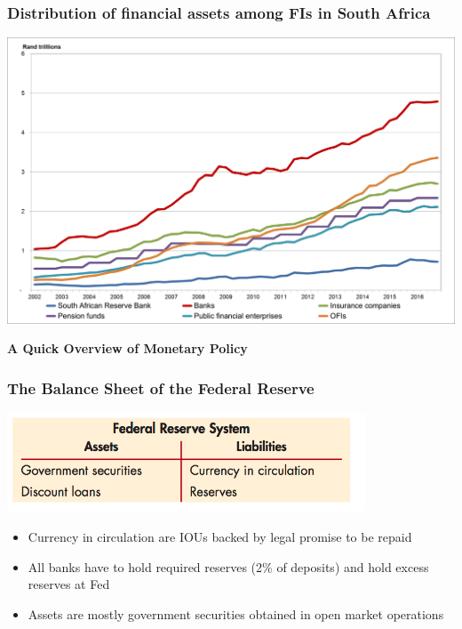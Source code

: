 \documentclass[11pt]{beamer}
\begin{document}
\begin{frame}
\frametitle{Distribution of financial assets among FIs in South Africa}
\includegraphics[width=\textwidth]{Figures/shadowbank7.png}
\end{frame}

\begin{frame}
  \begin{center}
    {\Large \textbf{A Quick Overview of Monetary Policy}}
  \end{center}
\end{frame}

\begin{frame}
\frametitle{The Balance Sheet of the Federal Reserve}
\begin{center}
  \includegraphics[width=0.8\textwidth]{Figures/FedBS1.png}
\end{center}
\begin{itemize}
  \item Currency in circulation are IOUs backed by legal promise to be repaid
  \item All banks have to hold required reserves (2\% of deposits) and hold excess reserves at Fed
  \item Assets are mostly government securities obtained in open market operations
\end{itemize}
\end{frame}
\end{document}
